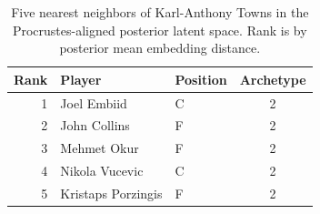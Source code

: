 \begin{table}[htbp]
  \centering\small
  \begin{tabular}{rllc}
    \toprule
    Rank & Player & Position & Archetype \\
    \midrule
    1 & Joel Embiid & C & 2 \\
    2 & John Collins & F & 2 \\
    3 & Mehmet Okur & F & 2 \\
    4 & Nikola Vucevic & C & 2 \\
    5 & Kristaps Porzingis & F & 2 \\
    \bottomrule
  \end{tabular}
  \caption{Five nearest neighbors of Karl-Anthony Towns in the Procrustes-aligned posterior latent space. Rank is by posterior mean embedding distance.}
  \label{tab:Karl_Anthony_Towns_neighbors}
\end{table}

